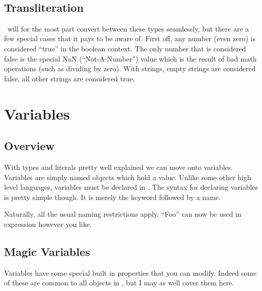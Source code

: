 \begin{SSCodeBox}
 \\
\end{SSCodeBox}

\subsection{Transliteration}

\SSquared\ will for the most part convert between these types seamlessly, but there are a few special cases that it pays to be aware of.  First off, any number (even zero) is considered ``true'' in the boolean context.  The only number that is considered false is the special NaN (``Not-A-Number'') value which is the result of bad math operations (such as dividing by zero).  With strings, empty strings are considered false, all other strings are considered true.


\section{Variables}

\subsection{Overview}

With types and literals pretty well explained we can move onto variables.  Variables are simply named objects which hold a value.  Unlike some other high level languages, variables must be declared in \SSquared{}.  The syntax for declaring variables is pretty simple though.  It is merely the  keyword followed by a name. 

\begin{SSCodeBox}
\end{SSCodeBox}

\noindent{}Naturally, all the usual naming restrictions apply.  ``Foo'' can now be used in expression however you like.

\begin{SSCodeBox}
\scitea{;}
\end{SSCodeBox}

\subsection{Magic Variables}

Variables have some special built in properties that you can modify.  Indeed some of these are common to all objects in \SSquared{}, but I may as well cover them here.  

